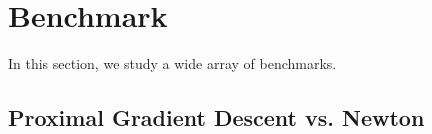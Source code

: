 \section{Benchmark}

In this section, we study a wide array of benchmarks.

\subsection{Proximal Gradient Descent vs. Newton}

